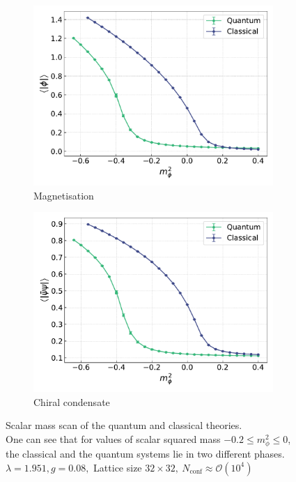 \begin{figure}[h]
    \centering
    \captionsetup[subfigure]{justification=centering}
    \begin{subfigure}[t]{0.47\textwidth}
        \centering
        \includegraphics[width=1.0\textwidth]{figures/chiral_PT/mass_scan/magnetisation.pdf}
        \caption{Magnetisation}
    \end{subfigure}
    \hfill
    \begin{subfigure}[t]{0.47\textwidth}
        \centering
        \includegraphics[width=1.0\textwidth]{figures/chiral_PT/mass_scan/condensate.pdf}
        \caption{Chiral condensate}
    \end{subfigure}
    \caption[Scalar mass scan of the quantum and classical theories]{Scalar mass scan of the quantum and classical theories. \\ One can see that for values of scalar squared mass $-0.2 \leq m_\phi^2 \leq 0$, the classical and the quantum systems lie in two different phases. \\
    $\lambda=1.951, g=0.08,$ Lattice size $32 \times 32, \ N_\text{conf} \approx \mathcal{O}(10^4)$}
    \label{fig:scans_classical_quantum}
\end{figure} \\
